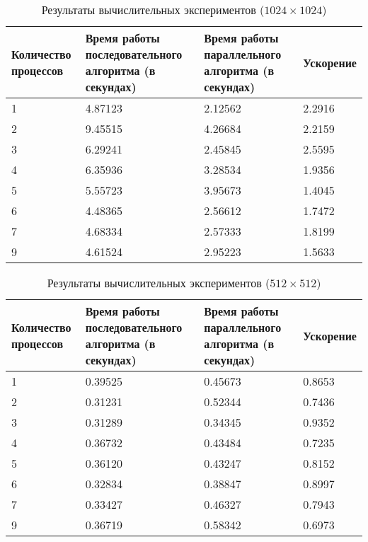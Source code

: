 \documentclass{report}
\begin{document}
\begin{table}[!h]
\caption{Результаты вычислительных экспериментов ($1024 \times 1024$)}
\centering
\begin{tabular}{| p{2cm} | p{3cm} | p{4cm} | p{2cm} |}
\hline
Количество процессов & Время работы последовательного алгоритма (в секундах) & Время работы параллельного алгоритма (в секундах) & Ускорение  \\[5pt]
\hline
1        & 4.87123        & 2.12562     & 2.2916       \\
2        & 9.45515        & 4.26684     & 2.2159       \\
3        & 6.29241        & 2.45845     & 2.5595       \\
4        & 6.35936        & 3.28534     & 1.9356       \\
5        & 5.55723        & 3.95673     & 1.4045       \\
6        & 4.48365        & 2.56612     & 1.7472       \\
7        & 4.68334        & 2.57333     & 1.8199       \\
9        & 4.61524        & 2.95223     & 1.5633	    \\
\hline
\end{tabular}
\end{table}

\begin{table}[!h]
\caption{Результаты вычислительных экспериментов ($512 \times 512$)}
\centering
\begin{tabular}{| p{2cm} | p{3cm} | p{4cm} | p{2cm} |}
\hline
Количество процессов & Время работы последовательного алгоритма (в секундах) & Время работы параллельного алгоритма (в секундах) & Ускорение  \\[5pt]
\hline
1        & 0.39525        & 0.45673     & 0.8653       \\
2        & 0.31231        & 0.52344     & 0.7436       \\
3        & 0.31289        & 0.34345     & 0.9352       \\
4        & 0.36732        & 0.43484     & 0.7235       \\
5        & 0.36120        & 0.43247     & 0.8152       \\
6        & 0.32834        & 0.38847     & 0.8997       \\
7        & 0.33427        & 0.46327     & 0.7943       \\
9        & 0.36719        & 0.58342     & 0.6973	    \\
\hline
\end{tabular}
\end{table}
\end{document}
